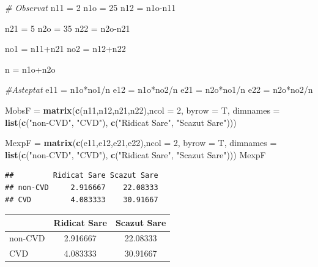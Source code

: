 \documentclass[]{article}
\newenvironment{Shaded}{\begin{snugshade}}{\end{snugshade}}
\newcommand{\KeywordTok}[1]{\textcolor[rgb]{0.13,0.29,0.53}{\textbf{{#1}}}}
\newcommand{\DataTypeTok}[1]{\textcolor[rgb]{0.13,0.29,0.53}{{#1}}}
\newcommand{\DecValTok}[1]{\textcolor[rgb]{0.00,0.00,0.81}{{#1}}}
\newcommand{\StringTok}[1]{\textcolor[rgb]{0.31,0.60,0.02}{{#1}}}
\newcommand{\CommentTok}[1]{\textcolor[rgb]{0.56,0.35,0.01}{\textit{{#1}}}}
\newcommand{\NormalTok}[1]{{#1}}
\begin{document}
\begin{Shaded}
\begin{Highlighting}[]
\CommentTok{# Observat}
\NormalTok{n11 =}\StringTok{ }\DecValTok{2}
\NormalTok{n1o =}\StringTok{ }\DecValTok{25}
\NormalTok{n12 =}\StringTok{ }\NormalTok{n1o-n11}

\NormalTok{n21 =}\StringTok{ }\DecValTok{5}
\NormalTok{n2o =}\StringTok{ }\DecValTok{35}
\NormalTok{n22 =}\StringTok{ }\NormalTok{n2o-n21}

\NormalTok{no1 =}\StringTok{ }\NormalTok{n11+n21}
\NormalTok{no2 =}\StringTok{ }\NormalTok{n12+n22}

\NormalTok{n =}\StringTok{ }\NormalTok{n1o+n2o}

\CommentTok{#Asteptat}
\NormalTok{e11 =}\StringTok{ }\NormalTok{n1o*no1/n}
\NormalTok{e12 =}\StringTok{ }\NormalTok{n1o*no2/n}
\NormalTok{e21 =}\StringTok{ }\NormalTok{n2o*no1/n}
\NormalTok{e22 =}\StringTok{ }\NormalTok{n2o*no2/n}

\NormalTok{MobsF =}\StringTok{ }\KeywordTok{matrix}\NormalTok{(}\KeywordTok{c}\NormalTok{(n11,n12,n21,n22),}\DataTypeTok{ncol =} \DecValTok{2}\NormalTok{, }\DataTypeTok{byrow =} \NormalTok{T, }
               \DataTypeTok{dimnames =} \KeywordTok{list}\NormalTok{(}\KeywordTok{c}\NormalTok{(}\StringTok{"non-CVD"}\NormalTok{, }\StringTok{"CVD"}\NormalTok{), }\KeywordTok{c}\NormalTok{(}\StringTok{"Ridicat Sare"}\NormalTok{, }\StringTok{"Scazut Sare"}\NormalTok{)))}

\NormalTok{MexpF =}\StringTok{ }\KeywordTok{matrix}\NormalTok{(}\KeywordTok{c}\NormalTok{(e11,e12,e21,e22),}\DataTypeTok{ncol =} \DecValTok{2}\NormalTok{, }\DataTypeTok{byrow =} \NormalTok{T, }
               \DataTypeTok{dimnames =} \KeywordTok{list}\NormalTok{(}\KeywordTok{c}\NormalTok{(}\StringTok{"non-CVD"}\NormalTok{, }\StringTok{"CVD"}\NormalTok{), }\KeywordTok{c}\NormalTok{(}\StringTok{"Ridicat Sare"}\NormalTok{, }\StringTok{"Scazut Sare"}\NormalTok{)))}
\NormalTok{MexpF}
\end{Highlighting}
\end{Shaded}

\begin{verbatim}
##         Ridicat Sare Scazut Sare
## non-CVD     2.916667    22.08333
## CVD         4.083333    30.91667
\end{verbatim}

\begin{longtable}[]{@{}lcc@{}}
\toprule
& Ridicat Sare & Scazut Sare\tabularnewline
\midrule
\endhead
non-CVD & 2.916667 & 22.08333\tabularnewline
CVD & 4.083333 & 30.91667\tabularnewline
\bottomrule
\end{longtable}
\end{document}
